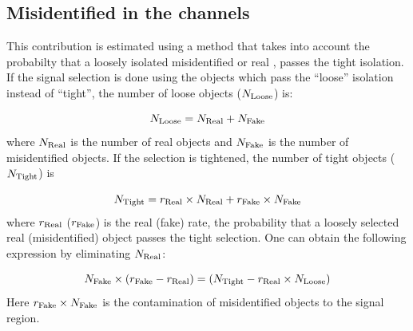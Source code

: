 \subsection{\texorpdfstring{Misidentified \Tau in the \leptonTau channels}{Misidentified tau in the lepton-tau channels}}
\label{sect:bkgFake}
This contribution is estimated using a method that takes into account the probabilty that a loosely isolated misidentified or real \Tau,
passes the tight isolation.
If the signal selection is done using the \Tau objects which pass the ``loose'' isolation instead of ``tight'', 
the number of loose \Tau objects ($N_{\rm Loose}$) is:

\begin{equation}
N_{\rm Loose} = N_{\rm Real} + N_{\rm Fake}
\end{equation}
where $N_{\rm Real}$ is the number of real \Tau objects and $N_{\rm Fake}$ is the number of misidentified 
\Tau objects. If the selection is tightened, the number of tight \Tau objects ($N_{\rm Tight}$)  is

\begin{equation}
 N_{\rm Tight} = r_{\rm Real}\times N_{\rm Real} + r_{\rm Fake}\times N_{\rm Fake}
\end{equation} 
where $r_{\rm Real}$ ($r_{\rm Fake}$) is the real (fake) rate, the probability that a loosely selected real (misidentified) \Tau object passes the  tight  selection. 
One can obtain the following expression by eliminating $N_{\rm Real}$:

\begin{equation}
   N_{\rm Fake}\times (r_{\rm Fake}-r_{\rm Real}) = (N_{\rm Tight} - r_{\rm Real}\times N_{\rm Loose})
\end{equation}
Here $r_{\rm Fake}\times N_{\rm Fake}$ is the contamination of misidentified \Tau objects to the signal region. 

